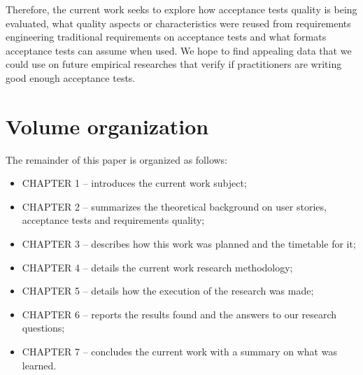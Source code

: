 Therefore, the current work seeks to explore how acceptance tests quality is being evaluated, what quality aspects or characteristics were reused from requirements engineering traditional requirements on acceptance tests and what formats acceptance tests can assume when used. We hope to find appealing data that we could use on future empirical researches that verify if practitioners are writing good enough acceptance tests.

\section{Volume organization}

The remainder of this paper is organized as follows:

\begin{itemize}
\item CHAPTER 1 – introduces the current work subject;
\item CHAPTER 2 – summarizes the theoretical background on user stories, acceptance tests and requirements quality;
\item CHAPTER 3 – describes how this work was planned and the timetable for it;
\item CHAPTER 4 – details the current work research methodology;
\item CHAPTER 5 – details how the execution of the research was made;
\item CHAPTER 6 – reports the results found and the answers to our research questions;
\item CHAPTER 7 – concludes the current work with a summary on what was learned.
\end{itemize}